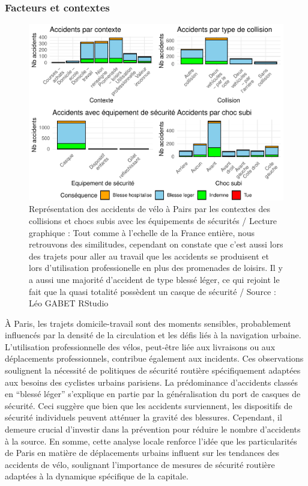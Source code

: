 \documentclass[french,]{compterendu}
\theoremstyle{urcastyle}
\theoremstyle{remark}
\begin{document}
\hypertarget{facteurs-et-contextes-1}{%
\subsubsection{Facteurs et contextes}\label{facteurs-et-contextes-1}}

\begin{figure}[H]

{\centering \includegraphics[width=0.9\linewidth]{Rapport_ADD_LEO-GABET_files/figure-latex/accCONTEXTE2-1} 

}

\caption{Représentation des accidents de vélo à Pairs par les contextes des collisions et chocs subis avec les équipements de sécurités / Lecture graphique : Tout comme à l'echelle de la France entière, nous retrouvons des similitudes, cependant on constate que c'est aussi lors des trajets pour aller au travail que les accidents se produisent et lors d'utilisation professionelle en plus des promenades de loisirs. Il y a aussi une majorité d'accident de type blessé léger, ce qui rejoint le fait que la quasi totalité possèdent un casque de sécurité / Source : Léo GABET RStudio}\label{fig:accCONTEXTE2}
\end{figure}

À Paris, les trajets domicile-travail sont des moments sensibles, probablement influencés par la densité de la circulation et les défis liés à la navigation urbaine. L'utilisation professionnelle des vélos, peut-être liée aux livraisons ou aux déplacements professionnels, contribue également aux incidents. Ces observations soulignent la nécessité de politiques de sécurité routière spécifiquement adaptées aux besoins des cyclistes urbains parisiens.
La prédominance d'accidents classés en ``blessé léger'' s'explique en partie par la généralisation du port de casques de sécurité. Ceci suggère que bien que les accidents surviennent, les dispositifs de sécurité individuels peuvent atténuer la gravité des blessures. Cependant, il demeure crucial d'investir dans la prévention pour réduire le nombre d'accidents à la source.
En somme, cette analyse locale renforce l'idée que les particularités de Paris en matière de déplacements urbains influent sur les tendances des accidents de vélo, soulignant l'importance de mesures de sécurité routière adaptées à la dynamique spécifique de la capitale.
\end{document}
